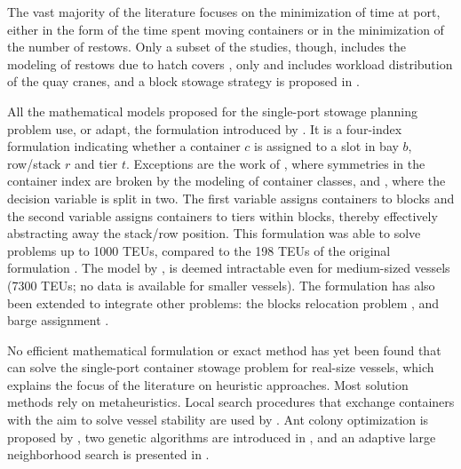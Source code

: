 \documentclass[preprint,12pt,authoryear]{elsarticle}
\begin{document}
The vast majority of the literature focuses on the minimization of time at port, either in the form of the time spent moving containers or in the minimization of the number of restows. Only a subset of the studies, though, includes the modeling of restows due to hatch covers \citep{Cho1981DevelopmentPlanning,Delgado2012ABays,Zhu2020IntegerProblem,Larsen2021AProblem}, only \cite{Larsen2021AProblem} and \cite{Sciomachen2007AProductivity} includes workload distribution of the quay cranes, and a block stowage strategy is proposed in \cite{Larsen2021AProblem}.

All the mathematical models proposed for the single-port stowage planning problem use, or adapt, the formulation introduced by \cite{Ambrosino2004StowingProblem}. It is a  four-index formulation indicating whether a container $c$ is assigned to a slot in bay $b$, row/stack $r$ and tier $t$. Exceptions are the work of \cite{Larsen2021AProblem}, where symmetries in the container index are broken by the modeling of container classes, and  \cite{Zhu2020IntegerProblem}, where the decision variable is split in two. The first variable assigns containers to blocks and the second variable assigns containers to tiers within blocks, thereby effectively abstracting away the stack/row position. This formulation was able to solve problems up to 1000 TEUs, compared to the  198 TEUs of the original formulation \citep{Ambrosino2004StowingProblem}. The model by \cite{Larsen2021AProblem}, is deemed intractable even for medium-sized vessels (7300 TEUs; no data is available for smaller vessels). The formulation has also been extended to integrate other problems: the blocks relocation problem \citep{Li2020OptimizingShipping}, and barge assignment \citep{ElYaagoubi2022Multi-objectiveSystem}.

No efficient mathematical formulation or exact method has yet been found that can solve the single-port container stowage problem for real-size vessels, which explains the focus of the literature on heuristic approaches. Most solution methods rely on metaheuristics. Local search procedures that exchange containers with the aim to solve vessel stability are used by \cite{Cho1981DevelopmentPlanning,Ambrosino2006AProblem,Li2020OptimizingShipping}. Ant colony optimization is proposed by \cite{Ambrosino2010AnProblem}, two genetic algorithms are introduced in \cite{Hu2012CombinatorialTerminal, ElYaagoubi2022Multi-objectiveSystem}, and an adaptive large neighborhood search is presented in \cite{Larsen2021AProblem}. 
\end{document}
